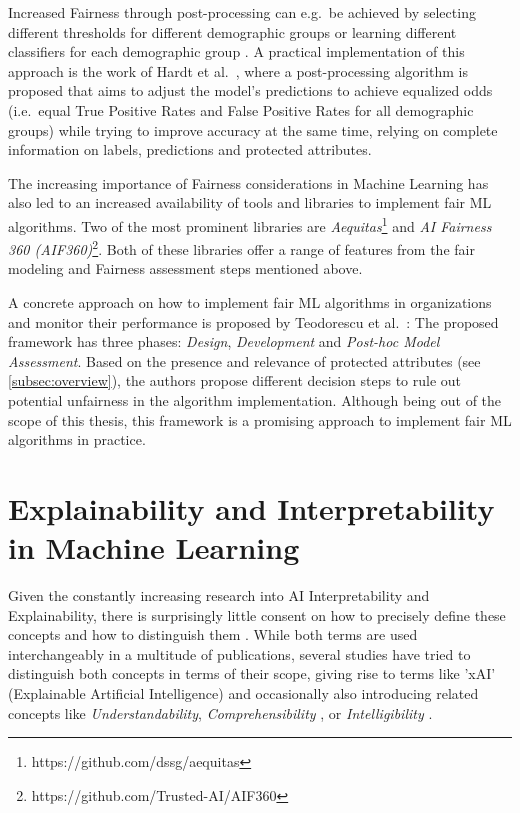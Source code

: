 Increased Fairness through post-processing can e.g.\ be achieved by selecting different thresholds for different demographic groups or learning different classifiers for each demographic group \parencite{Pessach2020}.
A practical implementation of this approach is the work of Hardt et al.\ \parencite{Hardt2016}, where a post-processing algorithm is proposed that aims to adjust the model's predictions to achieve equalized odds (i.e.\ equal True Positive Rates and False Positive Rates for all demographic groups) while trying to improve accuracy at the same time, relying on complete information on labels, predictions and protected attributes. 


The increasing importance of Fairness considerations in Machine Learning has also led to an increased availability of tools and libraries to implement fair ML algorithms.
Two of the most prominent libraries are \textit{Aequitas}\footnote{https://github.com/dssg/aequitas} and \textit{AI Fairness 360 (AIF360)}\footnote{https://github.com/Trusted-AI/AIF360}.
Both of these libraries offer a range of features from the fair modeling and Fairness assessment steps mentioned above.


A concrete approach on how to implement fair ML algorithms in organizations and monitor their performance is proposed by Teodorescu et al.\ \parencite{Teodorescu2020}:
The proposed framework has three phases: \textit{Design}, \textit{Development} and \textit{Post-hoc Model Assessment}. Based on the presence and relevance of protected attributes (see \autoref{subsec:overview}), the authors propose different decision steps to rule out potential unfairness in the algorithm implementation.
Although being out of the scope of this thesis, this framework is a promising approach to implement fair ML algorithms in practice.

\section{Explainability and Interpretability in Machine Learning}\label{sec:explainability}

Given the constantly increasing research into AI Interpretability and Explainability, there is surprisingly little consent on how to precisely define these concepts and how to distinguish them \parencite{Linardatos2021}. 
While both terms are used interchangeably in a multitude of publications, several studies have tried to distinguish both concepts in terms of their scope, giving rise to terms like 'xAI' (Explainable Artificial Intelligence) \parencite{Gunning2019} and occasionally also introducing related concepts like \textit{Understandability}, \textit{Comprehensibility} \parencite{Guidotti2018}, or \textit{Intelligibility} \parencite{Caruana2015}.


